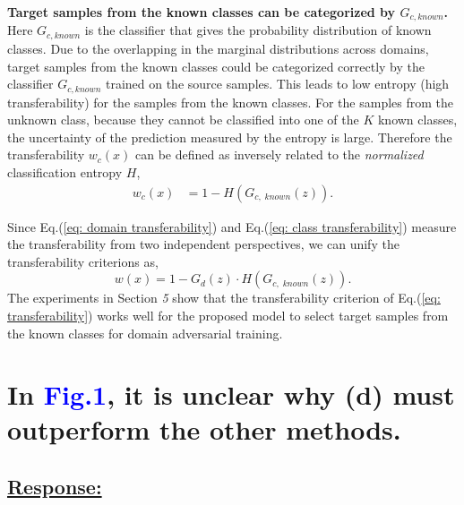 \textbf{Target samples from the known classes can be categorized by $G_{c, known}$.}
Here $G_{c, known}$ is the classifier that gives the probability distribution of known classes.
Due to the overlapping in the marginal distributions across domains, target samples from the known classes could be categorized correctly by the classifier $G_{c, known}$ trained on the source samples.
This leads to low entropy (high transferability) for the samples from the known classes.
For the samples from the unknown class, because they cannot be classified into one of the $K$ known classes, the uncertainty of the prediction measured by the entropy is large.
Therefore the transferability $w_c(x)$ can be defined as inversely related to the \textit{normalized} classification entropy $H$,
\begin{align}
    w_c(x) &=1-H(G_{c,\; known}(z)). \label{eq: class transferability}
\end{align}

Since Eq.(\ref{eq: domain transferability}) and Eq.(\ref{eq: class transferability}) measure the transferability from two independent perspectives, we can unify the transferability criterions as,
\begin{equation}
    \label{eq: transferability}
    w(x)=1-G_d(z)\cdot H(G_{c,\; known}(z)).
\end{equation}
The experiments in Section \textit{5} show that the transferability criterion of Eq.(\ref{eq: transferability}) works well for the proposed model to select target samples from the known classes for domain adversarial training.

\section{In \textcolor{blue}{Fig.1}, it is unclear why (d) must outperform the other methods.}
\subsection*{\underline{\textbf{Response:}}}

